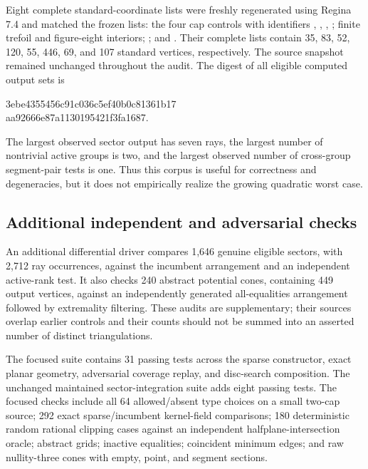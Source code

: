 Eight complete standard-coordinate lists were freshly regenerated
using Regina 7.4 and matched the frozen lists: the four cap
controls with identifiers ,
, ,
; finite trefoil and figure-eight interiors;
; and
.  Their complete lists contain
35, 83, 52, 120, 55, 446, 69, and 107 standard vertices,
respectively.  The source snapshot remained unchanged throughout
the audit.  The digest of all eligible computed output sets is
\begin{center}\footnotesize\ttfamily
3ebe4355456c91c036c5ef40b0c81361b17\\
aa92666e87a1130195421f3fa1687.
\end{center}

The largest observed sector output has seven rays, the largest
number of nontrivial active groups is two, and the largest observed
number of cross-group segment-pair tests is one.  Thus this corpus
is useful for correctness and degeneracies, but it does not
empirically realize the growing quadratic worst case.

\subsection{Additional independent and adversarial checks}

An additional differential driver compares 1,646 genuine eligible
sectors, with 2,712 ray occurrences, against the incumbent
arrangement and an independent active-rank test.  It also checks
240 abstract potential cones, containing 449 output vertices,
against an independently generated all-equalities arrangement
followed by extremality filtering.  These audits are supplementary;
their sources overlap earlier controls and their counts should
not be summed into an asserted number of distinct triangulations.

The focused suite contains 31 passing tests across the sparse
constructor, exact planar geometry, adversarial coverage replay,
and disc-search composition.  The unchanged maintained
sector-integration suite adds eight passing tests.  The focused
checks include all 64 allowed/absent type choices on a small
two-cap source; 292 exact sparse/incumbent kernel-field comparisons;
180 deterministic random rational clipping cases against an
independent halfplane-intersection oracle; abstract grids;
inactive equalities; coincident minimum edges; and raw nullity-three
cones with empty, point, and segment sections.

